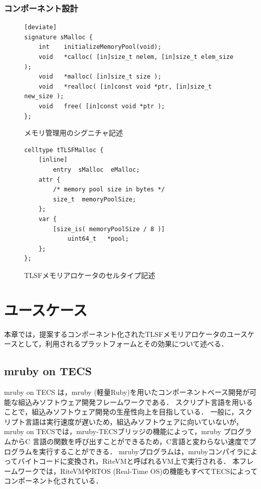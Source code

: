 \documentclass[submit]{ipsj_v2/UTF8/ipsj}
\begin{document}
\subsubsection{コンポーネント設計}


\begin{figure}[t]
\centering
\begin{lstlisting}
[deviate]
signature sMalloc {
    int    initializeMemoryPool(void);
    void   *calloc( [in]size_t nelem, [in]size_t elem_size );
    void   *malloc( [in]size_t size );
    void   *realloc( [in]const void *ptr, [in]size_t new_size );
    void   free( [in]const void *ptr );
};
\end{lstlisting}
\caption{メモリ管理用のシグニチャ記述}  
\label{src:TLSFSignature}
\end{figure}

\begin{figure}[t]
\centering
\begin{lstlisting}
celltype tTLSFMalloc {
    [inline]
        entry  sMalloc  eMalloc;
    attr {
        /* memory pool size in bytes */
        size_t  memoryPoolSize;
    };
    var {
        [size_is( memoryPoolSize / 8 )]
            uint64_t   *pool;
    };
};
\end{lstlisting}
\caption{TLSFメモリアロケータのセルタイプ記述}  
\label{src:TLSFCelltype}
\end{figure}

\section{ユースケース}
\label{sec:UseCase}

本章では，提案するコンポーネント化されたTLSFメモリアロケータのユースケースとして，利用されるプラットフォームとその効果について述べる．

\subsection{mruby on TECS}
\label{sec:mrubyonTECS}

mruby on TECS は，mruby (軽量Ruby)を用いたコンポーネントベース開発が可能な組込みソフトウェア開発フレームワークである．
スクリプト言語を用いることで，組込みソフトウェア開発の生産性向上を目指している．
一般に，スクリプト言語は実行速度が遅いため，組込みソフトウェアに向いていないが，mruby on TECSでは，mruby-TECSブリッジの機能によって，mruby プログラムからC 言語の関数を呼び出すことができるため，C言語と変わらない速度でプログラムを実行することができる．
mrubyプログラムは，mrubyコンパイラによってバイトコードに変換され，RiteVMと呼ばれるVM上で実行される．
本フレームワークでは，RiteVMやRTOS (Real-Time OS)の機能もすべてTECSによってコンポーネント化されている．
\end{document}
